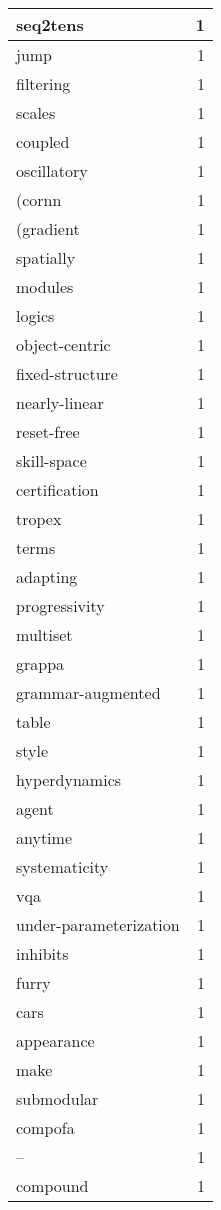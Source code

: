 \begin{table}[h]
\begin{tabular}{|l|r|}
\hline
seq2tens & 1 \\
\hline
jump & 1 \\
\hline
filtering & 1 \\
\hline
scales & 1 \\
\hline
coupled & 1 \\
\hline
oscillatory & 1 \\
\hline
(cornn & 1 \\
\hline
(gradient & 1 \\
\hline
spatially & 1 \\
\hline
modules & 1 \\
\hline
logics & 1 \\
\hline
object-centric & 1 \\
\hline
fixed-structure & 1 \\
\hline
nearly-linear & 1 \\
\hline
reset-free & 1 \\
\hline
skill-space & 1 \\
\hline
certification & 1 \\
\hline
tropex & 1 \\
\hline
terms & 1 \\
\hline
adapting & 1 \\
\hline
progressivity & 1 \\
\hline
multiset & 1 \\
\hline
grappa & 1 \\
\hline
grammar-augmented & 1 \\
\hline
table & 1 \\
\hline
style & 1 \\
\hline
hyperdynamics & 1 \\
\hline
agent & 1 \\
\hline
anytime & 1 \\
\hline
systematicity & 1 \\
\hline
vqa & 1 \\
\hline
under-parameterization & 1 \\
\hline
inhibits & 1 \\
\hline
furry & 1 \\
\hline
cars & 1 \\
\hline
appearance & 1 \\
\hline
make & 1 \\
\hline
submodular & 1 \\
\hline
compofa & 1 \\
\hline
– & 1 \\
\hline
compound & 1 \\

\end{tabular}
\end{table}
